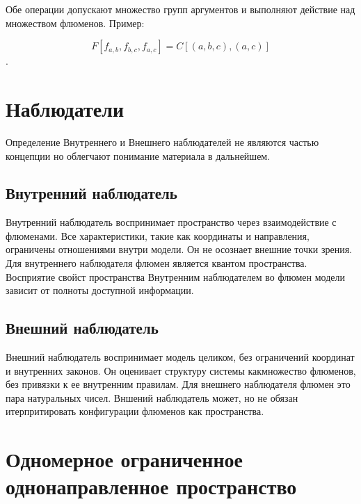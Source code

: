 \documentclass[final]{article}
\begin{document}
        Обе операции допускают множество групп аргументов и выполняют 
        действие над множеством флюменов. Пример: 

        \[ F[f_{a,b}, f_{b,c}, f_{a,c}] = C[(a,b,c), (a,c)]\].


    \section{Наблюдатели}

        Определение Внутреннего и Внешнего наблюдателей не являются частью концепции
        но облегчают понимание материала в дальнейшем.

        \subsection{Внутренний наблюдатель}

            Внутренний наблюдатель воспринимает пространство через 
            взаимодействие с флюменами. Все характеристики, такие как координаты 
            и направления, ограничены отношениями внутри модели. Он не осознает 
            внешние точки зрения. Для внутреннего наблюдателя флюмен является 
            квантом пространства. Восприятие свойст пространства Внутренним 
            наблюдателем во флюмен модели зависит от полноты доступной 
            информации.

        \subsection{Внешний наблюдатель}

        Внешний наблюдатель воспринимает модель целиком, без ограничений 
        координат и внутренних законов. Он оценивает структуру системы 
        какмножество флюменов, без привязки к ее внутренним правилам. Для 
        внешнего наблюдателя флюмен это пара натуральных чисел. Вншений 
        наблюдатель может, но не обязан итерпритировать конфигурации флюменов 
        как пространства.

    \section{Одномерное ограниченное однонаправленное пространство}
\end{document}
